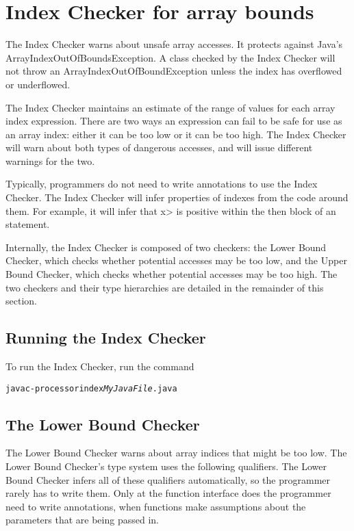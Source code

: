 \chapter{Index Checker for array bounds\label{index-checker}}

The Index Checker warns about unsafe array accesses.  It protects
against Java's ArrayIndexOutOfBoundsException. A class checked by the
Index Checker  will not throw an ArrayIndexOutOfBoundException unless the
index has overflowed or underflowed.

The Index Checker maintains an estimate of the range of values for each array
index expression.  There are two ways an expression can fail to be safe for use as an
array index: either it can be too low or it can be too high. The Index
Checker will warn about both types of dangerous accesses, and will
issue different warnings for the two.

Typically, programmers do not need to write annotations to use the
Index Checker. The Index Checker will infer properties of indexes from
the code around them.  For example, it will infer that \<x> is positive
within the then block of an  statement.

Internally, the Index Checker is composed of two checkers: the Lower
Bound Checker, which checks whether potential accesses may be too low,
and the Upper Bound Checker, which checks whether potential accesses
may be too high. The two checkers and their type hierarchies are
detailed in the remainder of this section.

\section{Running the Index Checker\label{index-running}}

To run the Index Checker, run the command

\begin{alltt}
  javac -processor index \emph{MyJavaFile}.java
\end{alltt}


\section{The Lower Bound Checker\label{index-lowerbound}}

The Lower Bound Checker warns about array indices that might be
too low.  The
Lower Bound Checker's type system uses the following qualifiers.
The Lower Bound Checker infers all of these qualifiers automatically,
so the programmer rarely has to write them. Only at the function interface
does the programmer need to write annotations, when functions make assumptions
about the parameters that are being passed in.

